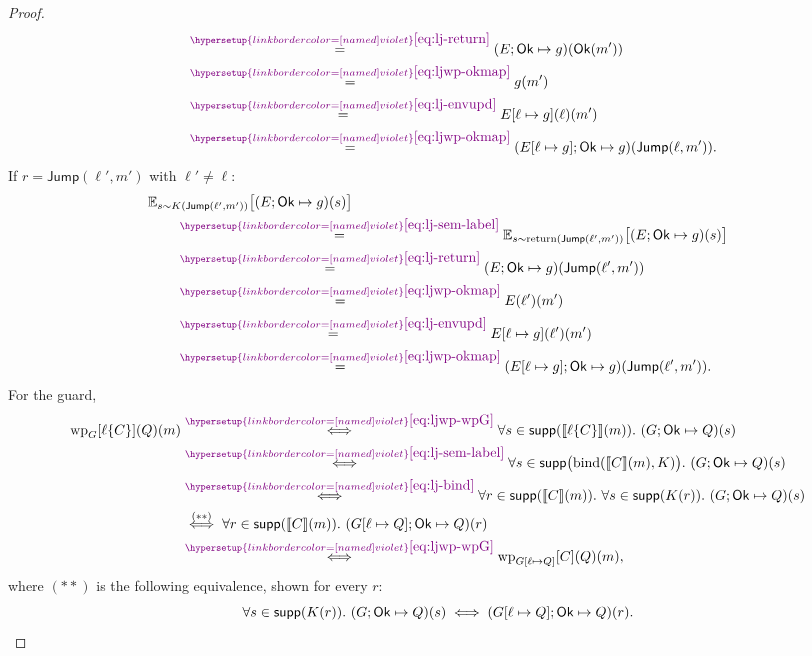 \documentclass[acmsmall,natbib,review,screen,anonymous,10pt]{acmart}
\makeatletter
\let\@msm@th@eqref\eqref
\renewcommand{\eqref}[1]{%
  \begingroup
  \leavevmode
  \color{violet}%
  \hypersetup{linkbordercolor=[named]{violet}}%
  \@msm@th@eqref{#1}%
  \endgroup
}
\makeatother
\begin{document}
\begin{proof}
\[\begin{aligned}
  &\qquad\overset{\eqref{eq:lj-return}}{=}
  (E;\mathsf{Ok}\mapsto g)(\mathsf{Ok}(m'))\\
  &\qquad\overset{\eqref{eq:ljwp-okmap}}{=}
  g(m')\\
  &\qquad\overset{\eqref{eq:lj-envupd}}{=}
  E[\ell\mapsto g](\ell)(m')\\
  &\qquad\overset{\eqref{eq:ljwp-okmap}}{=}
  (E[\ell\mapsto g];\mathsf{Ok}\mapsto g)(\mathsf{Jump}(\ell,m')).
  \end{aligned}
\]
If $r=\mathsf{Jump}(\ell',m')$ with $\ell'\neq\ell$:
\[
  \begin{aligned}
  &\mathbb E_{s\sim K(\mathsf{Jump}(\ell',m'))}\bigl[(E;\mathsf{Ok}\mapsto g)(s)\bigr]\\
  &\qquad\overset{\eqref{eq:lj-sem-label}}{=}
  \mathbb E_{s\sim\operatorname{return}(\mathsf{Jump}(\ell',m'))}
  \bigl[(E;\mathsf{Ok}\mapsto g)(s)\bigr]\\
  &\qquad\overset{\eqref{eq:lj-return}}{=}
  (E;\mathsf{Ok}\mapsto g)(\mathsf{Jump}(\ell',m'))\\
  &\qquad\overset{\eqref{eq:ljwp-okmap}}{=}
  E(\ell')(m')\\
  &\qquad\overset{\eqref{eq:lj-envupd}}{=}
  E[\ell\mapsto g](\ell')(m')\\
  &\qquad\overset{\eqref{eq:ljwp-okmap}}{=}
  (E[\ell\mapsto g];\mathsf{Ok}\mapsto g)(\mathsf{Jump}(\ell',m')).
  \end{aligned}
\]
For the guard,
\[
  \begin{aligned}
  \mathrm{wp}_{G}[\ell\{C\}](Q)(m)
  &\overset{\eqref{eq:ljwp-wpG}}{\iff}
  \forall s\in\supp(\llbracket \ell\{C\}\rrbracket(m)).\
  (G;\mathsf{Ok}\mapsto Q)(s)\\
  &\overset{\eqref{eq:lj-sem-label}}{\iff}
  \forall s\in\supp\bigl(\operatorname{bind}(\llbracket C\rrbracket(m),K)\bigr).\
  (G;\mathsf{Ok}\mapsto Q)(s)\\
  &\overset{\eqref{eq:lj-bind}}{\iff}
  \forall r\in\supp(\llbracket C\rrbracket(m)).\
  \forall s\in\supp(K(r)).\ (G;\mathsf{Ok}\mapsto Q)(s)\\
  &\overset{(**)}{\iff}
  \forall r\in\supp(\llbracket C\rrbracket(m)).\
  (G[\ell\mapsto Q];\mathsf{Ok}\mapsto Q)(r)\\
  &\overset{\eqref{eq:ljwp-wpG}}{\iff}
  \mathrm{wp}_{G[\ell\mapsto Q]}[C](Q)(m),
  \end{aligned}
\]
where $(**)$ is the following equivalence, shown for every $r$:
\[
  \forall s\in\mathsf{supp}(K(r)).\ (G;\mathsf{Ok}\mapsto Q)(s)
  \iff(G[\ell\mapsto Q];\mathsf{Ok}\mapsto Q)(r).
\]
\end{proof}
\end{document}

